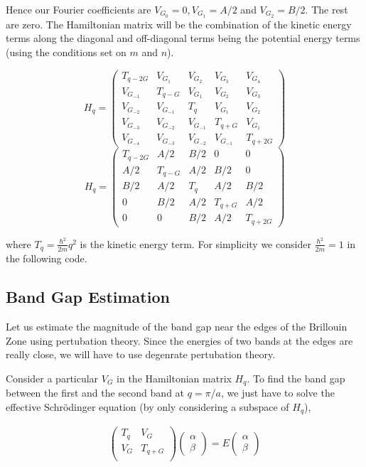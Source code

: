 \documentclass[12pt,a4paper]{article}
\begin{document}
Hence our Fourier coefficients are $V_{G_0} = 0, V_{G_1} = A/2$ and $V_{G_2} = B/2$. The rest are zero. The Hamiltonian matrix will be the combination of the kinetic energy terms along the diagonal and off-diagonal terms being the potential energy terms (using the conditions set on $m$ and $n$).

$$H_q = \begin{pmatrix} 
 T_{q-2G} & V_{G_1} & V_{G_2} & V_{G_3} & V_{G_4} \\ 
 V_{G_{-1}} & T_{q-G} & V_{G_1} & V_{G_2} & V_{G_3} \\ 
 V_{G_{-2}} & V_{G_{-1}} & T_{q} & V_{G_1} & V_{G_2} \\ 
 V_{G_{-3}} & V_{G_{-2}} & V_{G_{-1}} & T_{q+G} & V_{G_1}\\ 
 V_{G_{-4}} & V_{G_{-3}} & V_{G_{-2}} & V_{G_{-1}} & T_{q+2G}
\end{pmatrix}$$
$$\boxed{H_q=\begin{pmatrix} 
 T_{q-2G} & A/2 & B/2 & 0 & 0 \\ 
 A/2 & T_{q-G} & A/2 & B/2 & 0\\ 
 B/2 & A/2 & T_{q} &A/2 & B/2 \\ 
 0 & B/2 & A/2 & T_{q+G} & A/2\\
 0 & 0 & B/2 & A/2 & T_{q+2G}
\end{pmatrix}}$$

where $T_q = \frac{\hbar^2}{2m}q^2$ is the kinetic energy term. For simplicity we consider $\frac{\hbar^2}{2m} = 1$ in the following code.
\subsection{Band Gap Estimation} \label{1.3}
Let us estimate the magnitude of the band gap near the edges of the Brillouin Zone using pertubation theory. Since the energies of two bands at the edges are really close, we will have to use degenrate pertubation theory. 

Consider a particular $V_G$ in the Hamiltonian matrix $H_q$. To find the band gap between the first and the second band at $q=\pi/a$, we just have to solve the effective Schr\"{o}dinger equation (by only considering a subspace of $H_q$),

\begin{align*}
    \begin{pmatrix} 
        T_{q} & V_G \\ 
       V_G & T_{q+G}\\ 
    \end{pmatrix} \begin{pmatrix} 
        \alpha\\ \beta 
    \end{pmatrix} = E \begin{pmatrix} 
        \alpha\\ \beta 
    \end{pmatrix}
\end{align*}
\end{document}
